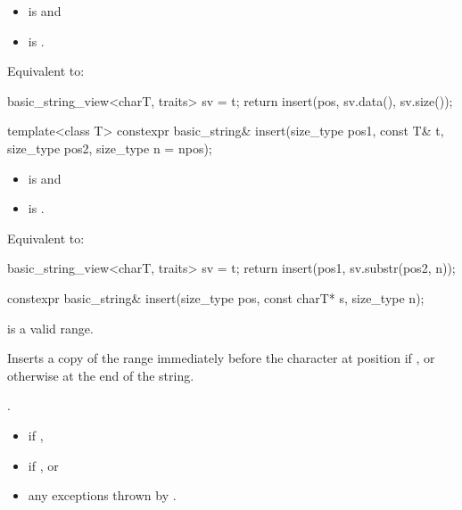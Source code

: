 \begin{itemdescr}
\pnum
\constraints
\begin{itemize}
\item
{} is
 and
\item
{} is
.
\end{itemize}

\pnum
\effects
Equivalent to:
\begin{codeblock}
basic_string_view<charT, traits> sv = t;
return insert(pos, sv.data(), sv.size());
\end{codeblock}
\end{itemdescr}

%
\begin{itemdecl}
template<class T>
  constexpr basic_string& insert(size_type pos1, const T& t,
                                 size_type pos2, size_type n = npos);
\end{itemdecl}

\begin{itemdescr}
\pnum
\constraints
\begin{itemize}
\item
{} is
 and
\item
{} is
.
\end{itemize}

\pnum
\effects
Equivalent to:
\begin{codeblock}
basic_string_view<charT, traits> sv = t;
return insert(pos1, sv.substr(pos2, n));
\end{codeblock}
\end{itemdescr}

%
\begin{itemdecl}
constexpr basic_string& insert(size_type pos, const charT* s, size_type n);
\end{itemdecl}

\begin{itemdescr}
\pnum
\expects
{} is a valid range.

\pnum
\effects
Inserts a copy of the range 
immediately before the character at position  if ,
or otherwise at the end of the string.

\pnum
\returns
{}.

\pnum
\throws
\begin{itemize}
\item {} if ,
\item {} if , or
\item any exceptions thrown by .
\end{itemize}
\end{itemdescr}

